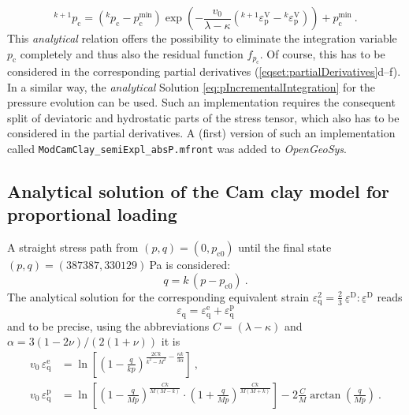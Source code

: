 \documentclass[paper=a4, twoside, pagesize]{scrartcl}
\newcommand{\tensor}[1]{\underline{#1}}
\newcommand{\ppkt}{\colon}
\newcommand{\D}{\text{D}}
\renewcommand{\c}{\text{c}}
\newcommand{\e}{\text{e}}
\newcommand{\p}{\text{p}}
\newcommand{\minus}{-}
\begin{document}
\begin{equation}\label{eq:pcIncrementalIntegration}
    {}^{k+1}p_\c = \left({}^k p_\c - p^\text{min}_\c\right) \exp\left(\minus\frac{v_0}{\lambda-\kappa}\left({}^{k+1}\varepsilon_\p^\text{V}-{}^k\varepsilon_\p^\text{V}\right)\right) + p^\text{min}_\c \ .
\end{equation}
This \emph{analytical} relation offers the possibility to eliminate the integration variable $p_\c$ completely and thus also the residual function $f_{p_\c}$. Of course, this has to be considered in the corresponding partial derivatives {(\ref{eqset:partialDerivatives}d--f)}. In a similar way, the \emph{analytical} Solution \eqref{eq:pIncrementalIntegration} for the pressure evolution can be used.
Such an implementation requires the consequent split of deviatoric and hydrostatic parts of the stress tensor, which also has to be considered in the partial derivatives. A (first) version of such an implementation called \texttt{ModCamClay\_semiExpl\_absP.mfront} was added to \textsl{OpenGeoSys}.


\subsection{Analytical solution of the Cam clay model for proportional loading}
\label{subsec:AppSolutionPeric}

A straight stress path from $(p,q)=(0, p_{\c0})$ until the final state $(p,q)=(387387, 330129)\ $Pa is considered:
\begin{equation}
    q = k\,(p-p_{\c0}) \ .
\end{equation}
The analytical solution \cite{Peric2006} for the corresponding equivalent strain $\varepsilon_{\text{q}}^2= {\tfrac{2}{3}\ \tensor\varepsilon^\D\ppkt\tensor\varepsilon^\D}$ reads
\begin{equation}
    \varepsilon_{\text{q}} = \varepsilon^\e_{\text{q}} + \varepsilon^\p_{\text{q}}
\end{equation}
and to be precise, using the abbreviations $C = (\lambda\minus\kappa)$ and $\alpha = 3(1-2\nu) / (2(1+\nu))$ it is
\begin{align}
    v_0\,\varepsilon^\e_{\text{q}} &= \ln\left[\left(1-\frac{q}{kp}\right)^{\frac{2Ck}{k^2-M^2}-\frac{\kappa k}{3\alpha}}\right]\ ,\\
    v_0\,\varepsilon^\p_{\text{q}} &= \ln\left[\left(1-\frac{q}{Mp}\right)^{\frac{Ck}{M(M-k)}} 
                                          \cdot\left(1+\frac{q}{Mp}\right)^{\frac{Ck}{M(M+k)}}\right]
                                          - 2 \frac{C}{M}\arctan\left(\frac{q}{Mp}\right)\ .
\end{align}
\end{document}

